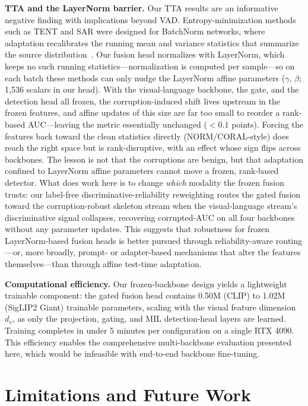 \documentclass[sigconf]{acmart}
\begin{document}
\textbf{TTA and the LayerNorm barrier.} Our TTA results are an informative negative finding with implications beyond VAD. Entropy-minimization methods such as TENT and SAR were designed for BatchNorm networks, where adaptation recalibrates the running mean and variance statistics that summarize the source distribution~\cite{wang2021tent}. Our fusion head normalizes with LayerNorm, which keeps no such running statistics---normalization is computed per sample---so on each batch these methods can only nudge the LayerNorm affine parameters ($\gamma$, $\beta$; 1{,}536 scalars in our head). With the visual-language backbone, the gate, and the detection head all frozen, the corruption-induced shift lives upstream in the frozen features, and affine updates of this size are far too small to reorder a rank-based AUC---leaving the metric essentially unchanged ($<0.1$ points). Forcing the features back toward the clean statistics directly (NORM/CORAL-style) does reach the right space but is rank-disruptive, with an effect whose sign flips across backbones. The lesson is not that the corruptions are benign, but that adaptation confined to LayerNorm affine parameters cannot move a frozen, rank-based detector. What does work here is to change \emph{which} modality the frozen fusion trusts: our label-free discriminative-reliability reweighting routes the gated fusion toward the corruption-robust skeleton stream when the visual-language stream's discriminative signal collapses, recovering corrupted-AUC on all four backbones without any parameter updates. This suggests that robustness for frozen LayerNorm-based fusion heads is better pursued through reliability-aware routing---or, more broadly, prompt- or adapter-based mechanisms that alter the features themselves---than through affine test-time adaptation.

\textbf{Computational efficiency.} Our frozen-backbone design yields a lightweight trainable component: the gated fusion head contains 0.50M (CLIP) to 1.02M (SigLIP2 Giant) trainable parameters, scaling with the visual feature dimension $d_v$, as only the projection, gating, and MIL detection-head layers are learned. Training completes in under 5 minutes per configuration on a single RTX 4090. This efficiency enables the comprehensive multi-backbone evaluation presented here, which would be infeasible with end-to-end backbone fine-tuning.

\section{Limitations and Future Work}
\end{document}

